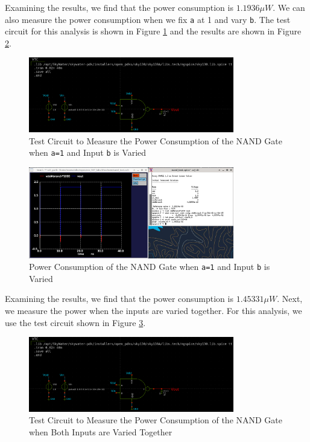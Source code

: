 \documentclass[fleqn]{article}
\begin{document}
	Examining the results, we find that the power consumption is $1.1936{\mu}W$. We can also measure the power consumption when we fix \texttt{a} at 1 and vary \texttt{b}. The test circuit for this analysis is shown in Figure \ref{fig::nand_power_test_sweep_vb} and the results are shown in Figure \ref{fig::nand_power_sweep_vb}.
	
	\begin{figure}[H]
		\centerline{\includegraphics[width=0.8\textwidth]{nand_power_test_sweep_vb.png}}
		\caption{Test Circuit to Measure the Power Consumption of the NAND Gate when \texttt{a=1} and Input \texttt{b} is Varied}
		\label{fig::nand_power_test_sweep_vb}
	\end{figure}
	
	\begin{figure}[H]
		\centerline{\includegraphics[width=0.8\textwidth]{nand_power_sweep_vb.png}}
		\caption{Power Consumption of the NAND Gate when \texttt{a=1} and Input \texttt{b} is Varied}
		\label{fig::nand_power_sweep_vb}
	\end{figure}
	
	Examining the results, we find that the power consumption is $1.45331{\mu}W$. Next, we measure the power when the inputs are varied together. For this analysis, we use the test circuit shown in Figure \ref{fig::nand_power_test_sweep_va_vb}.
	
	\begin{figure}[H]
		\centerline{\includegraphics[width=0.8\textwidth]{nand_power_test_sweep_vb.png}}
		\caption{Test Circuit to Measure the Power Consumption of the NAND Gate when Both Inputs are Varied Together}
		\label{fig::nand_power_test_sweep_va_vb}
	\end{figure}
	
\end{document}

